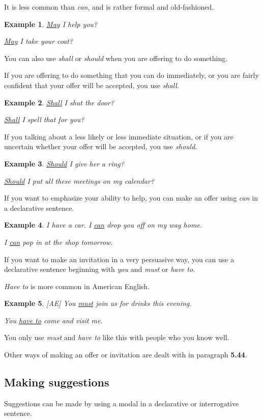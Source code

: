 \documentclass[oneside]{book}
\numberwithin{equation}{section}
\newtheorem{example}{Example}[section]
\begin{document}
It is less common than \textit{can}, and is rather formal and old-fashioned.
\begin{example}
    \underline{May} I help you?
    
    \underline{May} I take your coat?
\end{example}
%
\noindent{} You can also use \textit{shall} or \textit{should} when you are offering to do something.

%
If you are offering to do something that you can do immediately, or you are fairly confident that your offer will be accepted, you use \textit{shall}.
\begin{example}
    \underline{Shall} I shut the door?
    
    \underline{Shall} I spell that for you?
\end{example}
If you talking about a less likely or less immediate situation, or if you are uncertain whether your offer will be accepted, you use \textit{should}.
\begin{example}
    \underline{Should} I give her a ring?
    
    \underline{Should} I put all these meetings on my calendar?
\end{example}
%
\noindent{} If you want to emphasize your ability to help, you can make an offer using \textit{can} in a declarative sentence.
\begin{example}
    I have a car. I \underline{can} drop you off on my way home.
    
    I \underline{can} pop in at the shop tomorrow.
\end{example}
%
\noindent{} If you want to make an invitation in a very persuasive way, you can use a declarative sentence beginning with \textit{you} and \textit{must} or \textit{have to}.

\textit{Have to} is more common in American English.
\begin{example}
    \emph{[AE]} You \underline{must} join us for drinks this evening.
    
    You \underline{have to} come and visit me.
\end{example}
You only use \textit{must} and \textit{have to} like this with people who you know well.

%
\noindent{} Other ways of making an offer or invitation are dealt with in paragraph \textbf{5.44}.

\subsection{Making suggestions}
\noindent{} Suggestions can be made by using a modal in a declarative or interrogative sentence.
\end{document}
